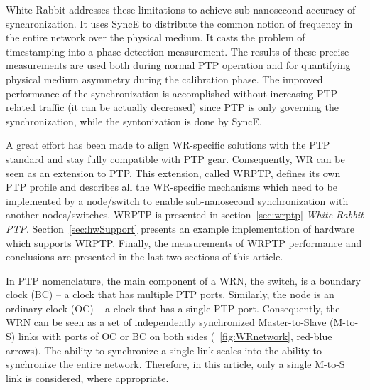 White Rabbit addresses these limitations to achieve sub-nanosecond accuracy
of synchronization. It uses SyncE to distribute the common notion of frequency in the entire
network over the physical medium. It casts the problem of timestamping into a phase detection
measurement. The results of these precise measurements are used both during normal PTP operation
and for quantifying physical medium asymmetry during the calibration phase.
The improved performance of the synchronization is accomplished without increasing PTP-related
traffic (it can be actually decreased) since PTP is only governing the synchronization, while the
syntonization is done by SyncE.

A great effort has been made to align WR-specific solutions with the PTP standard and stay fully
compatible with PTP gear. Consequently, WR can be seen as an extension to PTP. This extension,
called WRPTP, defines its own PTP profile and describes all the WR-specific mechanisms which need
to be implemented by a node/switch to enable sub-nanosecond synchronization with another 
nodes/switches. 
WRPTP is presented in section~\ref{sec:wrptp} \textit{White Rabbit PTP}.
Section~\ref{sec:hwSupport} presents an example implementation of 
hardware which supports WRPTP. Finally, the measurements of WRPTP performance and conclusions are
presented in the last two sections of this article.

In PTP nomenclature, the main component of a WRN, the switch, is a boundary clock (BC) -- a clock 
that has multiple PTP ports. Similarly, the node is an ordinary clock (OC) --
a clock that has a single PTP port. Consequently, the WRN
can be seen as a set of independently synchronized Master-to-Slave
(M-to-S) links with ports of OC or BC on both sides
(\figurename~\ref{fig:WRnetwork}, red-blue arrows). The ability to
synchronize a single link scales into the ability to synchronize the
entire network. Therefore, in this article, only a single M-to-S link is
considered, where appropriate.


